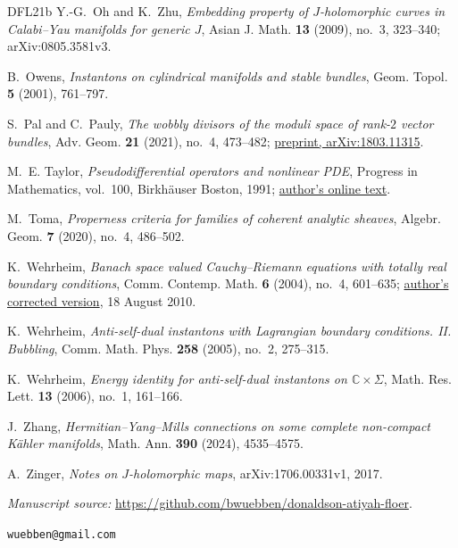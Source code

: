 \documentclass[11pt]{amsart}
\theoremstyle{definition}
\theoremstyle{remark}
\theoremstyle{plain}
\newcommand{\CC}{\mathbb{C}}
\begin{document}
\begin{thebibliography}{DFL21b}
 Y.-G.~Oh and K.~Zhu,
\emph{Embedding property of $J$-holomorphic curves in Calabi--Yau
manifolds for generic $J$}, Asian J. Math. \textbf{13} (2009),
no.~3, 323--340; arXiv:0805.3581v3.

 B.~Owens, \emph{Instantons on cylindrical
manifolds and stable bundles}, Geom. Topol. \textbf{5} (2001), 761--797.

 S.~Pal and C.~Pauly,
\emph{The wobbly divisors of the moduli space of rank-$2$ vector
bundles}, Adv. Geom. \textbf{21} (2021), no.~4, 473--482;
\href{https://arxiv.org/abs/1803.11315}{preprint, arXiv:1803.11315}.

 M.~E. Taylor,
\emph{Pseudodifferential operators and nonlinear PDE},
Progress in Mathematics, vol.~100, Birkh\"auser Boston, 1991;
\href{https://mtaylor.web.unc.edu/wp-content/uploads/sites/16915/2018/04/NLIN.pdf}
{author's online text}.

 M.~Toma, \emph{Properness criteria for families
of coherent analytic sheaves}, Algebr. Geom. \textbf{7} (2020), no.~4,
486--502.

 K.~Wehrheim, \emph{Banach space valued
Cauchy--Riemann equations with totally real boundary conditions},
Comm. Contemp. Math. \textbf{6} (2004), no.~4, 601--635;
\href{https://math.berkeley.edu/~katrin/papers/asd_cauchy.pdf}
{author's corrected version}, 18 August 2010.

 K.~Wehrheim, \emph{Anti-self-dual
instantons with Lagrangian boundary conditions. II. Bubbling}, Comm. Math.
Phys. \textbf{258} (2005), no.~2, 275--315.

 K.~Wehrheim, \emph{Energy identity for
anti-self-dual instantons on $\CC\times\Sigma$}, Math. Res. Lett.
\textbf{13} (2006), no.~1, 161--166.

 J.~Zhang,
\emph{Hermitian--Yang--Mills connections on some complete non-compact
K\"ahler manifolds}, Math. Ann. \textbf{390} (2024), 4535--4575.

 A.~Zinger,
\emph{Notes on $J$-holomorphic maps}, arXiv:1706.00331v1, 2017.

\end{thebibliography}

\noindent\emph{Manuscript source:}
\url{https://github.com/bwuebben/donaldson-atiyah-floer}.

\bigskip
{}
\texttt{wuebben@gmail.com}
\end{document}
